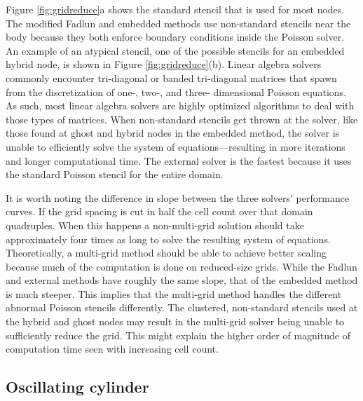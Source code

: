 Figure \ref{fig:gridreduce}a shows the standard stencil that is used for most nodes. 
The modified Fadlun and embedded methods use non-standard stencils near the body because they both enforce boundary conditions inside the Poisson solver. 
An example of an atypical stencil, one of the possible stencils for an embedded hybrid node, is shown in Figure \ref{fig:gridreduce}(b). 
Linear algebra solvers commonly encounter tri-diagonal or banded tri-diagonal
matrices that spawn from the discretization of one-, two-, and three- dimensional Poisson equations. 
As such, most linear algebra solvers are highly optimized algorithms to deal with those types of matrices. 
When non-standard stencils get thrown at the solver, like those found at ghost and hybrid nodes in the embedded method, the solver is unable to efficiently solve the system of equations---resulting in more iterations and longer computational time. 
The external solver is the fastest because it uses the standard Poisson stencil for the entire domain. 

It is worth noting the difference in slope between the three solvers' performance curves. 
If the grid spacing is cut in half the cell count over that domain quadruples. 
When this happens a non-multi-grid solution should take approximately four times as long to solve the resulting system of equations. 
Theoretically, a multi-grid method should be able to achieve better scaling because much of the computation is done on reduced-size grids. 
While the Fadlun and external methods have roughly the same slope, that of the embedded method is much steeper. 
This implies that the multi-grid method handles the different abnormal Poisson stencils differently. 
The clustered, non-standard stencils used at the hybrid and ghost nodes may result in the multi-grid solver being unable to sufficiently reduce the grid. 
This might explain the higher order of magnitude of computation time seen with increasing cell count. 

\subsection{Oscillating cylinder}

